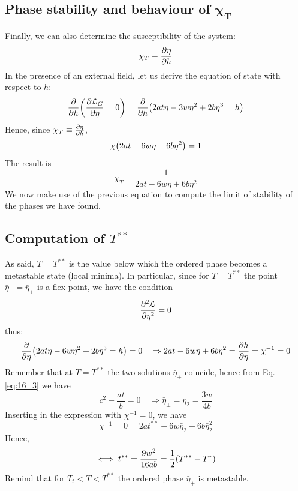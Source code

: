 \documentclass[../../Main/Main.tex]{subfiles}
\begin{document}
\subsection{Phase stability and behaviour of \( \pmb{\chi _T }\)}
Finally, we can also determine the susceptibility of the system:
\begin{equation*}
  \chi _T \equiv \pdv{\eta }{h}
\end{equation*}
In the presence of an external field, let us derive the equation of state with respect to \( h \):
\begin{equation*}
  \pdv{}{h} \qty(\pdv{\mathcal{L}_G}{\eta } = 0 )   = \pdv{}{h} \qty(2 a t \eta - 3 w \eta ^2 +  2b \eta ^3 = h)
\end{equation*}
Hence, since \(   \chi _T \equiv \pdv{\eta }{h} \),
\begin{equation*}
   \chi \qty(2 a t - 6 w \eta + 6 b \eta ^2 ) =1
\end{equation*}
The result is
\begin{equation}
  \chi _T = \frac{1}{2 a t - 6 w \eta + 6 b \eta ^2}
  \label{eq:16_1}
\end{equation}
We now make use of the previous equation to compute the limit of stability of the phases we have found.

\subsection{Computation of \( T^{**} \) }
As said, \( T=T^{**} \) is the value below which the ordered phase becomes a metastable state (local minima). In particular, since for \( T=T^{**} \) the point \( \bar{\eta }_-=  \bar{\eta }_+ \) is a flex point, we have the condition
\begin{equation*}
    \pdv[2]{\mathcal{L}}{\eta } = 0
\end{equation*}
thus:
\begin{equation*}
    \pdv{}{\eta } \qty(   2 a t \eta  - 6 w \eta^2 + 2b \eta ^3 = h ) = 0 \quad  \Rightarrow   2 a t - 6 w \eta + 6b \eta ^2 = \pdv{h}{\eta } =  \chi ^{-1} = 0
\end{equation*}
Remember that at \( T=T^{**} \)  the two solutions \( \bar{\eta }_\pm \) coincide, hence from Eq.\eqref{eq:16_3} we have
\begin{equation*}
  c^2 - \frac{at}{b} = 0 \quad \Rightarrow \bar{\eta }_\pm = \eta _2 = \frac{3 w}{4b}
\end{equation*}
Inserting in the expression with \( \chi ^{-1} =0 \), we have
\begin{equation*}
  \chi ^{-1} = 0 = 2 a t^{**} - 6 w \bar{\eta }_2 + 6 b \bar{\eta }_2^2
\end{equation*}
Hence,
\begin{equation}
  \iff t^{**} = \frac{9 w^2}{16 a b} = \frac{1}{2} \qty(T^{**}-T^*)
\end{equation}
Remind that for \( T_t < T < T^{**} \) the ordered phase \( \bar{\eta }_+  \) is metastable.
\end{document}
